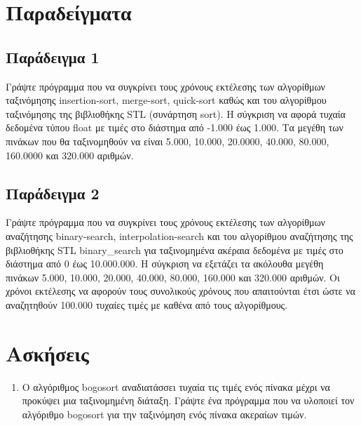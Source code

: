 





\section{Παραδείγματα}
\subsection{Παράδειγμα 1}
Γράψτε πρόγραμμα που να συγκρίνει τους χρόνους εκτέλεσης των αλγορίθμων ταξινόμησης insertion-sort, merge-sort, quick-sort καθώς και του αλγορίθμου ταξινόμησης της βιβλιοθήκης STL (συνάρτηση sort). Η σύγκριση να αφορά τυχαία δεδομένα τύπου float με τιμές στο διάστημα από -1.000 έως 1.000. Τα μεγέθη των πινάκων που θα ταξινομηθούν να είναι 5.000, 10.000, 20.0000, 40.000, 80.000, 160.0000 και 320.000 αριθμών. 






\subsection{Παράδειγμα 2}
Γράψτε πρόγραμμα που να συγκρίνει τους χρόνους εκτέλεσης των αλγορίθμων αναζήτησης binary-search, interpolation-search και του αλγορίθμου αναζήτησης της βιβλιοθήκης STL binary\_search για ταξινομημένα ακέραια δεδομένα με τιμές στο διάστημα από 0  έως 10.000.000. Η σύγκριση να εξετάζει τα ακόλουθα μεγέθη πινάκων 5.000, 10.000, 20.000, 40.000, 80.000, 160.000 και 320.000 αριθμών. Οι χρόνοι εκτέλεσης να αφορούν τους συνολικούς χρόνους που απαιτούνται έτσι ώστε να αναζητηθούν 100.000 τυχαίες τιμές με καθένα από τους αλγορίθμους. 






\section{Ασκήσεις}
\begin{enumerate}
\item Ο αλγόριθμος bogosort αναδιατάσσει τυχαία τις τιμές ενός πίνακα μέχρι να προκύψει μια ταξινομημένη διάταξη. Γράψτε ένα πρόγραμμα που να υλοποιεί τον αλγόριθμο bogosort για την ταξινόμηση ενός πίνακα ακεραίων τιμών.  

\end{enumerate}





